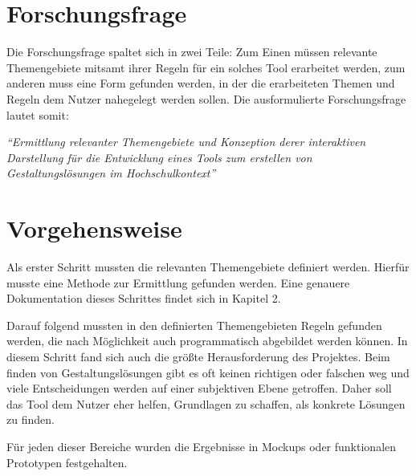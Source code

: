 \section{Forschungsfrage}
Die Forschungsfrage spaltet sich in zwei Teile: Zum Einen müssen relevante Themengebiete mitsamt ihrer Regeln für ein solches Tool erarbeitet werden, zum anderen muss eine Form gefunden werden, in der die erarbeiteten Themen und Regeln dem Nutzer nahegelegt werden sollen.
Die ausformulierte Forschungsfrage lautet somit:

\textit{“Ermittlung relevanter Themengebiete und Konzeption derer interaktiven Darstellung für die Entwicklung eines Tools zum erstellen von Gestaltungslösungen im Hochschulkontext”}




\section{Vorgehensweise}
Als erster Schritt mussten die relevanten Themengebiete definiert werden. Hierfür musste eine Methode zur Ermittlung gefunden werden. Eine genauere Dokumentation dieses Schrittes findet sich in Kapitel 2.

Darauf folgend mussten in den definierten Themengebieten Regeln gefunden werden, die nach Möglichkeit auch programmatisch abgebildet werden können.
In diesem Schritt fand sich auch die größte Herausforderung des Projektes. Beim finden von Gestaltungslösungen gibt es oft keinen richtigen oder falschen weg und viele Entscheidungen werden auf einer subjektiven Ebene getroffen. Daher soll das Tool dem Nutzer eher helfen, Grundlagen zu schaffen, als konkrete Lösungen zu finden.

Für jeden dieser Bereiche wurden die Ergebnisse in Mockups oder funktionalen Prototypen festgehalten.



\clearpage
